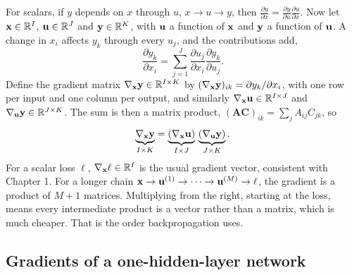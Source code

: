 For scalars, if $y$ depends on $x$ through $u$, $x\to u\to y$, then $\frac{\partial y}{\partial x}=\frac{\partial y}{\partial u}\frac{\partial u}{\partial x}$. Now let $\mathbf{x}\in\mathbb{R}^{I}$, $\mathbf{u}\in\mathbb{R}^{J}$ and $\mathbf{y}\in\mathbb{R}^{K}$, with $\mathbf{u}$ a function of $\mathbf{x}$ and $\mathbf{y}$ a function of $\mathbf{u}$. A change in $x_i$ affects $y_k$ through every $u_j$, and the contributions add,
\begin{equation}
  \frac{\partial y_k}{\partial x_i} = \sum_{j=1}^{J}\frac{\partial u_j}{\partial x_i}\frac{\partial y_k}{\partial u_j}.
\end{equation}
Define the gradient matrix $\nabla_{\mathbf{x}}\mathbf{y}\in\mathbb{R}^{I\times K}$ by $(\nabla_{\mathbf{x}}\mathbf{y})_{ik}=\partial y_k/\partial x_i$, with one row per input and one column per output, and similarly $\nabla_{\mathbf{x}}\mathbf{u}\in\mathbb{R}^{I\times J}$ and $\nabla_{\mathbf{u}}\mathbf{y}\in\mathbb{R}^{J\times K}$. The sum is then a matrix product, $(\mathbf{A}\mathbf{C})_{ik}=\sum_j A_{ij}C_{jk}$, so
\begin{equation}
  \underbrace{\nabla_{\mathbf{x}}\mathbf{y}}_{I\times K} = \underbrace{(\nabla_{\mathbf{x}}\mathbf{u})}_{I\times J}\,\underbrace{(\nabla_{\mathbf{u}}\mathbf{y})}_{J\times K}.
\end{equation}
For a scalar loss $\ell$, $\nabla_{\mathbf{x}}\ell\in\mathbb{R}^{I}$ is the usual gradient vector, consistent with Chapter 1. For a longer chain $\mathbf{x}\to\mathbf{u}^{(1)}\to\cdots\to\mathbf{u}^{(M)}\to\ell$, the gradient is a product of $M+1$ matrices. Multiplying from the right, starting at the loss, means every intermediate product is a vector rather than a matrix, which is much cheaper. That is the order backpropagation uses.

\subsection{Gradients of a one-hidden-layer network}

